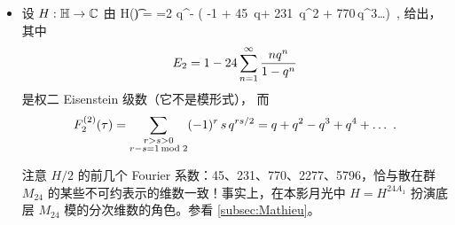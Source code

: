 \begin{itemize}
写 $\widehat H_r^{3E_8}(\t) = H_r^{3E_8} +(g_r^{3E_8})^\ast$，则
\begin{align}
\bem \widehat H_1^{3E_8}\\\widehat H_7^{3E_8}\eem(\t+1) =\bem \ex(-{1\over 120}) & 0 \\ 0 &\ex(-{49\over 120}) \eem \bem \widehat H_1^{3E_8}\\\widehat H_7^{3E_8}\eem(\t)
\end{align}
以及
\begin{align}
\bem \widehat H_1^{3E_8}\\\widehat H_7^{3E_8}\eem\left(-{1\over \t}\right) =\tau^{1/2} i^{3/2} \bem {1\over 2}\sqrt{1-{1\over \sqrt{5}}} &  {1\over 2}\sqrt{1+{1\over \sqrt{5}}}\\  {1\over 2}\sqrt{1-{1\over \sqrt{5}}} &- {1\over 2}\sqrt{1-{1\over \sqrt{5}}} \eem \bem \widehat H_1^{3E_8}\\\widehat H_7^{3E_8}\eem(\t)
\end{align}
{\sloppy 此外，$H_i^{3E_8}$ 可以看作由模拟 Jacobi 形式 $\psi^{3E_8}(\t,z):= \sum_{r\in I^{3E_8}} H_r^{3E_8}\sum_{a\in A}\tilde \theta^{3E_8}_{a\,r}$ 的 theta 复合得到。更具体地说，$\hat \psi^{3E_8}(\t,z):=\sum_{r\in I^{3E_8}} \widehat H_r^{3E_8}\sum_{a\in A}\tilde \theta^{3E_8}_{a\,r}$ 关于 $\t$ 非全纯，并按权 1、指标 30 的 Jacobi 形式变换。
正如记号所示，$H_r^{3E_8}$ 编码对应于根系统 $3E_8$ 的 Niemeier 格 $N$ 的本影月光情形背后的本影月光模的分次维数，我们将在 \S\ref{sec:umbral} 中讨论。\par}

\item 设 $H: \mathbb{H} \to \mathbb{C}$ 由
\be\label{second_def_H}
H(\t) = =2 q^{-} \left( -1 + 45\, q+ 231\, q^2 + 770\,q^3\dots \right)~,
\ee
给出，其中
$$E_2 = 1- 24\sum_{n=1}^\infty {nq^n \over 1-q^n }$$ 是权二 Eisenstein 级数（它不是模形式），
而
$$
F_2^{(2)}(\tau)= \sum_{\substack{r>s>0\\ r-s=1\, {\rm mod }\; 2 }} (-1)^{r} \,s \,q^{rs/2} = q+q^2-q^3+q^4+\dots ~.
$$


注意 $H/2$ 的前几个 Fourier 系数：45、231、770、2277、5796，恰与散在群 $M_{24}$ 的某些不可约表示的维数一致！事实上，在本影月光中 $H = H^{24A_1}$ 扮演底层 $M_{24}$ 模的分次维数的角色。参看 \ref{subsec:Mathieu}。


\end{itemize}
